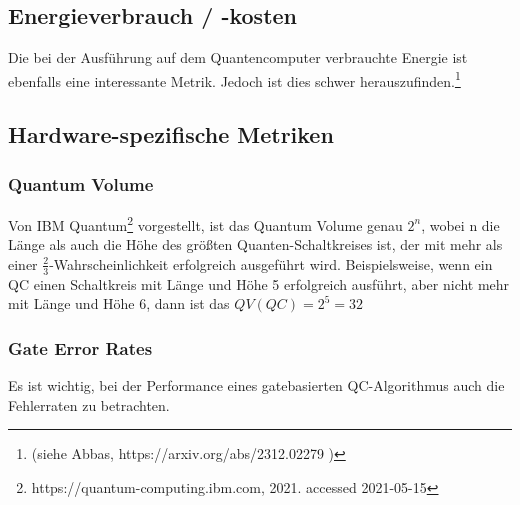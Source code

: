 \subsection{Energieverbrauch / -kosten}
Die bei der Ausführung auf dem Quantencomputer verbrauchte Energie ist ebenfalls eine interessante Metrik. Jedoch ist dies schwer herauszufinden.\footnote{(siehe Abbas, https://arxiv.org/abs/2312.02279 )}


\subsection{Hardware-spezifische Metriken}


\subsubsection{Quantum Volume}
Von IBM Quantum\footnote{https://quantum-computing.ibm.com, 2021. accessed 2021-05-15} vorgestellt, ist das Quantum Volume genau $2^{n} $, wobei n die Länge als auch die Höhe des größten Quanten-Schaltkreises ist, der mit mehr als einer $ \frac{2}{3} $-Wahrscheinlichkeit erfolgreich ausgeführt wird.
Beispielsweise, wenn ein QC einen Schaltkreis mit Länge und Höhe 5 erfolgreich ausführt, aber nicht mehr mit Länge und Höhe 6, dann ist das $ QV(QC) = 2^{5} = 32 $

\subsubsection{Gate Error Rates}
Es ist wichtig, bei der Performance eines gatebasierten QC-Algorithmus auch die Fehlerraten zu betrachten.





